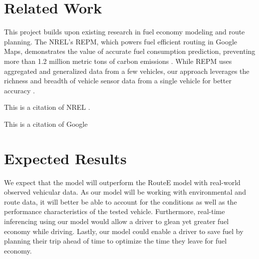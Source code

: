 \documentclass[letterpaper]{article}
\begin{document}
\section{Related Work}

This project builds upon existing research in fuel economy modeling and route planning. 
The NREL's REPM, which powers fuel efficient routing in Google Maps, 
demonstrates the value of accurate fuel consumption prediction, 
preventing more than 1.2 million metric tons of carbon emissions \cite{google_2023_environmental_report}.
While REPM uses aggregated and generalized data from a few vehicles, 
our approach leverages the richness and breadth of vehicle sensor data from a single vehicle for better accuracy \cite{nrel_routee}.


This is a citation of NREL \cite{nrel_routee}.

This is a citation of Google \cite{google_2023_environmental_report}

\section{Expected Results}

We expect that the model will outperform the RouteE model with real-world observed vehicular data. 
As our model will be working with environmental and route data, it will better be able to account for the conditions as well as the performance characteristics of the tested vehicle.
Furthermore, real-time inferencing using our model would allow a driver to glean yet greater fuel economy while driving.
Lastly, our model could enable a driver to save fuel by planning their trip ahead of time to optimize the time they leave for fuel economy.

 

\end{document}

